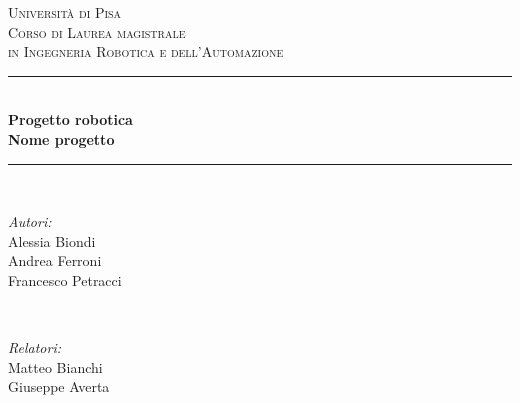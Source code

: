 
\begin{titlepage}
	\centering
	\vspace*{2 cm}
	\textsc{\Large Universit\`a di Pisa }\\[0.5 cm]							%
	\textsc{\large Corso di Laurea magistrale \\ 
		\vspace*{3mm} in Ingegneria Robotica e dell'Automazione}\\[1 cm]		%
	\rule{\linewidth}{0.2 mm} \\
	{ \Large{\textbf{Progetto robotica \\ Nome progetto}}}\\
	
	\rule{\linewidth}{0.2 mm} \\[2.5 cm]
	
	
	\vspace*{2 cm}
	\begin{minipage}{0.48\textwidth}
		\begin{flushleft}
			\textit{Autori:}\\
			Alessia Biondi\\
			Andrea Ferroni\\
			Francesco Petracci\\
			
		\end{flushleft}
	\end{minipage}~
	\begin{minipage}{0.48\textwidth}
		\begin{flushright}
			\textit{Relatori:}\\		
			Matteo Bianchi \\
			Giuseppe Averta
		\end{flushright}
	\end{minipage}\\[2 cm]
	
	
	
\end{titlepage}
\newpage
